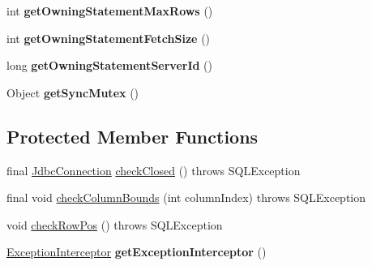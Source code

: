 \begin{DoxyCompactItemize}
int {\bfseries get\+Owning\+Statement\+Max\+Rows} ()
\item 
\mbox{\label{classcom_1_1mysql_1_1cj_1_1jdbc_1_1result_1_1_result_set_impl_a83dec80b3e36ced954f4965ca869df4e}} 
int {\bfseries get\+Owning\+Statement\+Fetch\+Size} ()
\item 
\mbox{\label{classcom_1_1mysql_1_1cj_1_1jdbc_1_1result_1_1_result_set_impl_ab47d7700a4925c8348d6e9ab8a7e80e1}} 
long {\bfseries get\+Owning\+Statement\+Server\+Id} ()
\item 
\mbox{\label{classcom_1_1mysql_1_1cj_1_1jdbc_1_1result_1_1_result_set_impl_a3dcbce7ef97301024277eb49d55fe26f}} 
Object {\bfseries get\+Sync\+Mutex} ()
\end{DoxyCompactItemize}
\subsection*{Protected Member Functions}
\begin{DoxyCompactItemize}
\item 
final \mbox{\hyperlink{interfacecom_1_1mysql_1_1cj_1_1jdbc_1_1_jdbc_connection}{Jdbc\+Connection}} \mbox{\hyperlink{classcom_1_1mysql_1_1cj_1_1jdbc_1_1result_1_1_result_set_impl_a885fe4be94caed65d13223f1bb07a9f4}{check\+Closed}} ()  throws S\+Q\+L\+Exception 
\item 
final void \mbox{\hyperlink{classcom_1_1mysql_1_1cj_1_1jdbc_1_1result_1_1_result_set_impl_aeca9bb7a778cc8e2c991cae4b2698f67}{check\+Column\+Bounds}} (int column\+Index)  throws S\+Q\+L\+Exception 
\item 
void \mbox{\hyperlink{classcom_1_1mysql_1_1cj_1_1jdbc_1_1result_1_1_result_set_impl_ab264cbfab311f9cbf06129d88ee25664}{check\+Row\+Pos}} ()  throws S\+Q\+L\+Exception 
\item 
\mbox{\label{classcom_1_1mysql_1_1cj_1_1jdbc_1_1result_1_1_result_set_impl_a0843c7c9052f5458f7597a7dbb6fcc5e}} 
\mbox{\hyperlink{interfacecom_1_1mysql_1_1cj_1_1exceptions_1_1_exception_interceptor}{Exception\+Interceptor}} {\bfseries get\+Exception\+Interceptor} ()
\end{DoxyCompactItemize}
